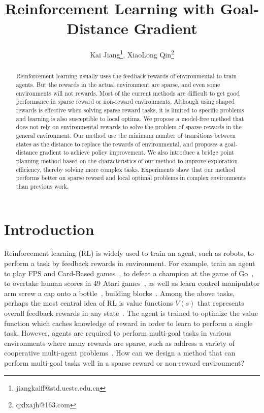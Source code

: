 \documentclass[8pt,twoside,a4paper]{article}
\title{Reinforcement Learning with Goal-Distance Gradient}  \author{Kai Jiang\footnote{jiangkaiff@std.uestc.edu.cn}, XiaoLong Qin\footnote{qxlxajh@163.com}}   \date{}
\begin{document}
\maketitle

\begin{abstract}
Reinforcement learning usually uses the feedback rewards of environmental to train agents. But the rewards in the actual environment are sparse, and even some environments will not rewards. Most of the current methods are difficult to get good performance in sparse reward or non-reward environments. Although using shaped rewards is effective when solving sparse reward tasks, it is limited to specific problems and learning is also susceptible to local optima. We propose a model-free method that does not rely on environmental rewards to solve the problem of sparse rewards in the general environment. Our method use the minimum number of transitions between states as the distance to replace the rewards of environmental, and proposes a goal-distance gradient to achieve policy improvement. We also introduce a bridge point planning method based on the characteristics of our method to improve exploration efficiency, thereby solving more complex tasks. Experiments show that our method performs better on sparse reward and local optimal problems in complex environments than previous work.
\end{abstract}

\section{Introduction}
Reinforcement learning (RL) is widely used to train an agent, such as robots, to perform a task by feedback rewards in environment. For example, train an agent to play FPS and Card-Based games~\cite{song2019playing,liu2019playing}, to defeat a champion at the game of Go~\cite{silver2016mastering}, to overtake human scores in 49 Atari games~\cite{guo2016deep}, as well as learn control manipulator arm screw a cap onto a bottle~\cite{levine2016end}, building blocks~\cite{nair2018visual}. Among the above tasks, perhaps the most central idea of RL is value functions $V(s)$ that represents overall feedback rewards in any state~\cite{sutton1998introduction}. The agent is trained to optimize the value function which caches knowledge of reward in order to learn to perform a single task. However, agents are required to perform multi-goal tasks in various environments where many rewards are sparse, such as address a variety of cooperative multi-agent problems~\cite{fu2019deep}. How can we design a method that can perform multi-goal tasks well in a sparse reward or non-reward environment?
\end{document}
